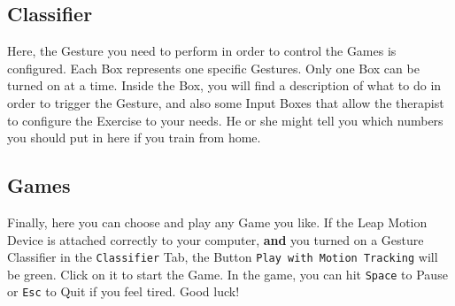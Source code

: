 \subsection{Classifier}
Here, the Gesture you need to perform in order to control the Games is configured. Each Box represents one specific Gestures. Only one Box can be turned on at a time. Inside the Box, you will find a description of what to do in order to trigger the Gesture, and also some Input Boxes that allow the therapist to configure the Exercise to your needs. He or she might tell you which numbers you should put in here if you train from home.

\subsection{Games}
Finally, here you can choose and play any Game you like. If the Leap Motion Device is attached correctly to your computer, \textbf{and} you turned on a Gesture Classifier in the \texttt{Classifier} Tab, the Button \texttt{Play with Motion Tracking} will be green. Click on it to start the Game. In the game, you can hit \texttt{Space} to Pause or \texttt{Esc} to Quit if you feel tired. Good luck!
